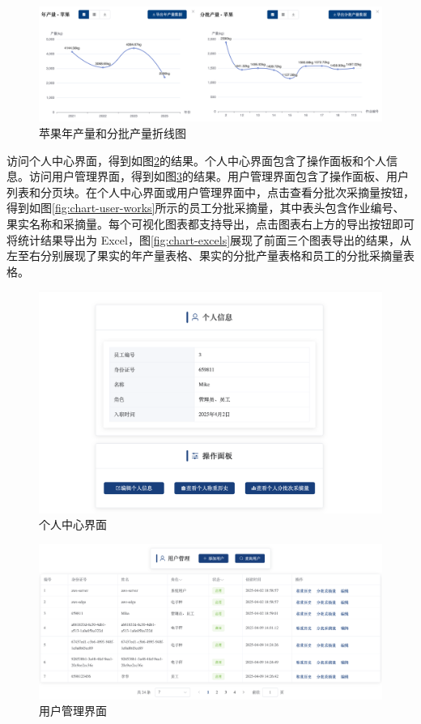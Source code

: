 \begin{figure}
    \centering
    \includegraphics[width=0.95\linewidth]{../result/chart-apple.png}
    \caption{苹果年产量和分批产量折线图}
    \label{fig:chart-apple}
\end{figure}

访问个人中心界面，得到如图\ref{fig:web-me}的结果。个人中心界面包含了操作面板和个人信息。访问用户管理界面，得到如图\ref{fig:web-user}的结果。用户管理界面包含了操作面板、用户列表和分页块。在个人中心界面或用户管理界面中，点击查看分批次采摘量按钮，得到如图\ref{fig:chart-user-works}所示的员工分批采摘量，其中表头包含作业编号、果实名称和采摘量。每个可视化图表都支持导出，点击图表右上方的导出按钮即可将统计结果导出为 Excel，图\ref{fig:chart-excels}展现了前面三个图表导出的结果，从左至右分别展现了果实的年产量表格、果实的分批产量表格和员工的分批采摘量表格。

\begin{figure}
    \centering
    \includegraphics[width=0.9\linewidth]{../result/web-me.png}
    \caption{个人中心界面}
    \label{fig:web-me}
\end{figure}

\begin{figure}
    \centering
    \includegraphics[width=0.9\linewidth]{../result/web-user.png}
    \caption{用户管理界面}
    \label{fig:web-user}
\end{figure}

